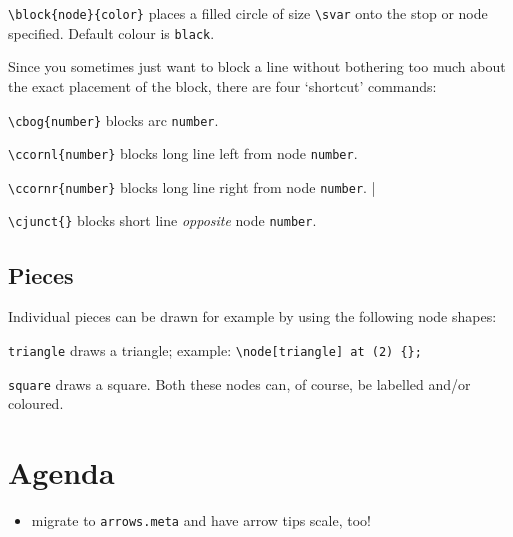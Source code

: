 \documentclass[a5paper]{scrartcl}
\begin{document}
\verb|\block{node}{color}| places a filled circle of size \verb|\svar| onto the stop or node specified. Default colour is \verb|black|.

Since you sometimes just want to block a line without bothering too much about the exact placement of the block, there are four `shortcut' commands:

\verb|\cbog{number}| blocks arc \verb|number|.

\verb|\ccornl{number}| blocks long line left from node  \verb|number|.

\verb|\ccornr{number}| blocks long line right from node  \verb|number|.
|

\verb|\cjunct{}| blocks short line \emph{opposite} node  \verb|number|.

\subsection*{Pieces}

Individual pieces can be drawn for example by using the following node shapes:

\noindent\verb|triangle| draws a triangle; example: \verb|\node[triangle] at (2) {}; |

\noindent\verb|square| draws a square. Both these nodes can, of course, be labelled and/or coloured.

\section*{Agenda}
\begin{itemize}
    \item migrate to \verb|arrows.meta| and have arrow tips scale, too!
\end{itemize}
\end{document}
